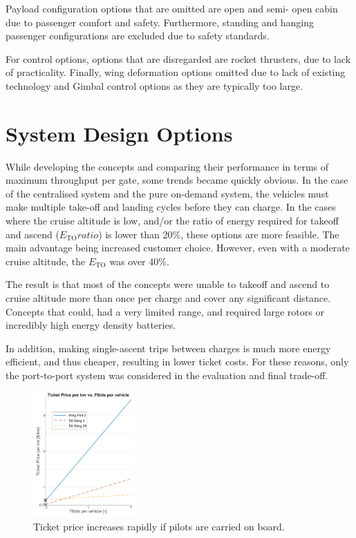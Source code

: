Payload configuration options that are omitted are open and semi- open cabin due to passenger comfort and safety. Furthermore, standing and hanging passenger configurations are excluded due to safety standards.

For control options, options that are disregarded are rocket thrusters, due to lack of practicality. Finally, wing deformation options omitted due to lack of existing technology and Gimbal control options as they are typically too large. 



\section{System Design Options}
While developing the concepts and comparing their performance in terms of maximum throughput per gate, some trends became quickly obvious. In the case of the centralised system and the pure on-demand system, the vehicles must make multiple take-off and landing cycles before they can charge. In the cases where the cruise altitude is low, and/or the ratio of energy required for takeoff and ascend ($E_\text{TO} ratio$) is lower than 20\%, these options are more feasible. The main advantage being increased customer choice. However, even with a moderate cruise altitude, the $E_\text{TO}$ was over 40\%.

The result is that most of the concepts were unable to takeoff and ascend to cruise altitude more than once per charge and cover any significant distance. Concepts that could, had a very limited range, and required large rotors or incredibly high energy density batteries.

In addition, making single-ascent trips between charges is much more energy efficient, and thus cheaper, resulting in lower ticket costs. For these reasons, only the port-to-port system was considered in the evaluation and final trade-off.

\begin{figure}
    \centering
    \includegraphics[width=0.35\textwidth]{Figures/Pilots_TPrice_perkm.png}
    \captionsetup{justification=centering}
    \caption{Ticket price increases rapidly if pilots are carried on board.}
    \label{fig:pilotedcost}
\end{figure}

